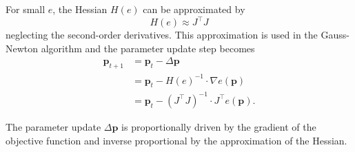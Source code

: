 For small $e$, the Hessian $H(e)$ can be approximated by
\begin{equation}
H(e) \approx J^\top J
\end{equation}
%
neglecting the second-order derivatives. This approximation is used in the Gauss-Newton algorithm and the parameter update step becomes
%
\begin{align}
\mathbf{p}_{t+1} &= \mathbf{p}_{t} - \Delta\mathbf{p} \\
&= \mathbf{p}_{t} - H(e)^{-1} \cdot \nabla e(\mathbf{p}) \\
&= \mathbf{p}_{t} - \left(J^\top J\right)^{-1} \cdot J^\top e(\mathbf{p}) .
\end{align}

The parameter update $\Delta\mathbf{p}$ is proportionally driven by the gradient of the objective function and inverse proportional by the approximation of the Hessian.

